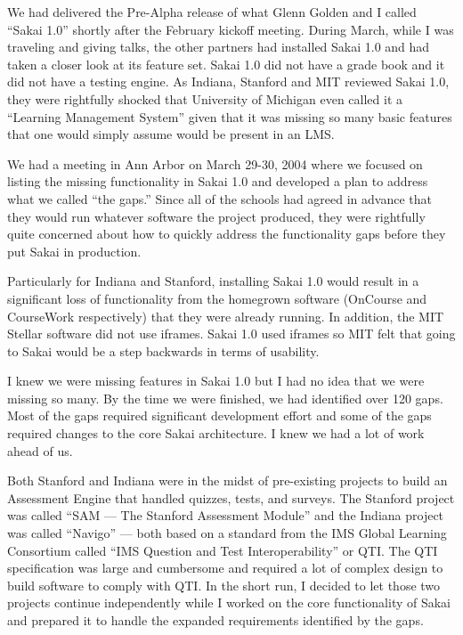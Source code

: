 \documentclass[12pt]{book}
\begin{document}
We had delivered the Pre-Alpha release of what Glenn Golden and I
called ``Sakai 1.0'' shortly after the February kickoff meeting.
During March, while I was traveling and giving talks,
the other partners had installed Sakai 1.0
and had taken a closer look at its feature set.
Sakai 1.0 did not have a grade book and it did not have a testing engine.
As Indiana, Stanford and MIT reviewed Sakai 1.0, they
were rightfully shocked that University of Michigan even called
it a ``Learning Management System'' given that it was missing so
many basic features that one would simply assume would be
present in an LMS.


We had a meeting in Ann Arbor on March 29-30, 2004 where we focused
on listing the missing functionality in Sakai 1.0 and developed
a plan to address what we called ``the gaps.''  Since all of
the schools had agreed in advance that they would run whatever
software the project produced, they were rightfully quite concerned
about how to quickly address the functionality gaps before
they put Sakai in production.

Particularly for Indiana and Stanford, installing Sakai 1.0 would
result in a significant loss of functionality from the homegrown
software (OnCourse and CourseWork respectively) that they were
already running.  In addition, the MIT Stellar software did not use iframes.
Sakai 1.0 used iframes so MIT felt that going to Sakai would be
a step backwards in terms of usability.

I knew we were missing features in Sakai 1.0 but I had no idea that
we were missing so many.  By the time we were finished, we
had identified over 120 gaps.  Most of the gaps required significant
development effort and some of the gaps required changes to the core
Sakai architecture.  I knew we had a lot of work ahead of us.

Both Stanford and Indiana were in the midst of pre-existing projects
to build an Assessment Engine that handled quizzes, tests, and surveys.
The Stanford project was called ``SAM --- The Stanford Assessment Module''
and the Indiana project was called ``Navigo'' --- both based on a
standard from the IMS Global Learning Consortium called ``IMS Question
and Test Interoperability'' or QTI.  The QTI specification was large
and cumbersome and required a lot of complex design to build software
to comply with QTI.  In the short run, I decided to let those two projects
continue independently while I worked on the core functionality of
Sakai and prepared it to handle the expanded requirements identified
by the gaps.
\end{document}
